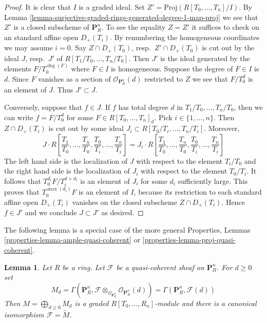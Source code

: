 \documentclass{stacks-project}
\theoremstyle{plain}
\newtheorem{lemma}[subsection]{Lemma}
\theoremstyle{definition}
\theoremstyle{remark}
\numberwithin{equation}{subsection}
\begin{document}
\begin{proof}
It is clear that $I$ is a graded ideal.
Set $Z' = \text{Proj}(R[T_0, \ldots, T_n]/I)$.
By Lemma \ref{lemma-surjective-graded-rings-generated-degree-1-map-proj}
we see that $Z'$ is a closed subscheme of $\mathbf{P}^n_R$.
To see the equality $Z = Z'$
it suffices to check on an standard affine open
$D_{+}(T_i)$. By renumbering the homogeneous coordinates we
may assume $i = 0$. Say $Z \cap D_{+}(T_0)$, resp.\ $Z' \cap D_{+}(T_0)$
is cut out by the ideal $J$, resp.\ $J'$ of $R[T_1/T_0, \ldots, T_n/T_0]$.
Then $J'$ is the ideal generated by the elements $F/T_0^{\deg(F)}$ where
$F \in I$ is homogeneous.
Suppose the degree of $F \in I$ is $d$. Since $F$ vanishes as a section
of $\mathcal{O}_{\mathbf{P}^n_R}(d)$ restricted to $Z$ we see that
$F/T_0^d$ is an element of $J$. Thus $J' \subset J$.

\medskip\noindent
Conversely, suppose that $f \in J$. If $f$ has total degree
$d$ in $T_1/T_0, \ldots, T_n/T_0$, then we can write
$f = F/T_0^d$ for some $F \in R[T_0, \ldots, T_n]_d$.
Pick $i \in \{1, \ldots, n\}$. Then $Z \cap D_{+}(T_i)$ is
cut out by some ideal $J_i \subset R[T_0/T_i, \ldots, T_n/T_i]$.
Moreover,
$$
J \cdot
R\left[
\frac{T_1}{T_0}, \ldots, \frac{T_n}{T_0},
\frac{T_0}{T_i}, \ldots, \frac{T_n}{T_i}
\right]
=
J_i \cdot
R\left[
\frac{T_1}{T_0}, \ldots, \frac{T_n}{T_0},
\frac{T_0}{T_i}, \ldots, \frac{T_n}{T_i}
\right]
$$
The left hand side is the localization of $J$ with respect to the
element $T_i/T_0$ and the right hand side is the localization of $J_i$
with respect to the element $T_0/T_i$. It follows that
$T_0^{d_i}F/T_i^{d + d_i}$ is an element of $J_i$ for some $d_i$
sufficiently large. This proves that $T_0^{\max(d_i)}F$ is an
element of $I$, because its restriction to each standard affine
open $D_{+}(T_i)$ vanishes on the closed subscheme
$Z \cap D_{+}(T_i)$. Hence $f \in J'$ and we conclude $J \subset J'$
as desired.
\end{proof}

\noindent
The following lemma is a special case of the more general
Properties, Lemmas \ref{properties-lemma-ample-quasi-coherent} or
\ref{properties-lemma-proj-quasi-coherent}.

\begin{lemma}
\label{lemma-quasi-coherent-projective-space}
Let $R$ be a ring.
Let $\mathcal{F}$ be a quasi-coherent sheaf on $\mathbf{P}^n_R$.
For $d \geq 0$ set
$$
M_d
=
\Gamma(\mathbf{P}^n_R,
\mathcal{F} \otimes_{\mathcal{O}_{\mathbf{P}^n_R}}
\mathcal{O}_{\mathbf{P}^n_R}(d))
=
\Gamma(\mathbf{P}^n_R, \mathcal{F}(d))
$$
Then $M = \bigoplus_{d \geq 0} M_d$ is a graded $R[T_0, \ldots, R_n]$-module
and there is a canonical isomorphism $\mathcal{F} = \widetilde{M}$.
\end{lemma}
\end{document}
